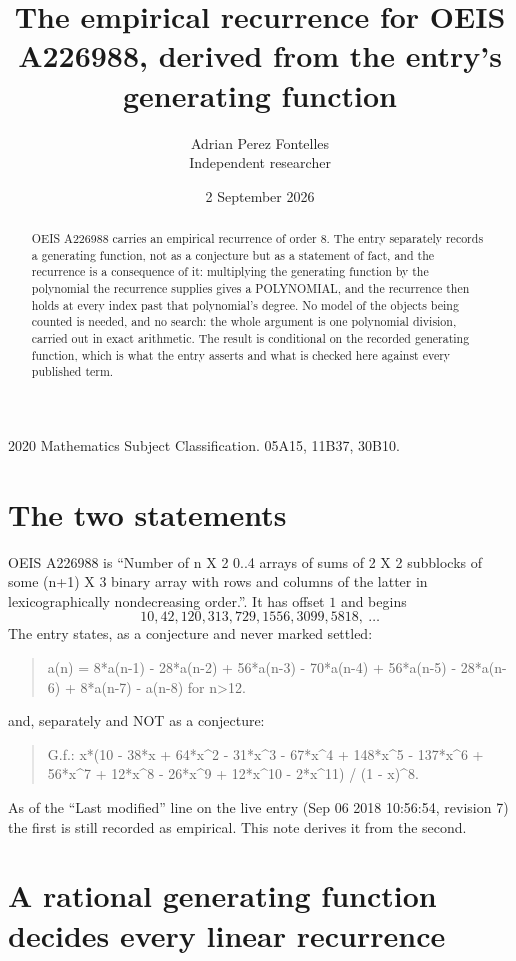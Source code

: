 \documentclass[11pt,a4paper]{article}
\title{The empirical recurrence for OEIS A226988, derived from the entry's generating function}
\author{Adrian Perez Fontelles\\ \small Independent researcher}
\date{2 September 2026}
\theoremstyle{plain}
\theoremstyle{definition}
\begin{document}
\maketitle

\begin{abstract}
OEIS A226988 carries an empirical recurrence of order $8$. The entry separately records a
generating function, not as a conjecture but as a statement of fact, and the recurrence is a
consequence of it: multiplying the generating function by the polynomial the recurrence
supplies gives a POLYNOMIAL, and the recurrence then holds at every index past that
polynomial's degree. No model of the objects being counted is needed, and no search: the
whole argument is one polynomial division, carried out in exact arithmetic. The result is
conditional on the recorded generating function, which is what the entry asserts and what is
checked here against every published term.
\end{abstract}

\noindent\small 2020 Mathematics Subject Classification. 05A15, 11B37, 30B10.\normalsize

\section{The two statements}

OEIS A226988 is ``Number of n X 2 0..4 arrays of sums of 2 X 2 subblocks of some (n+1) X 3 binary array with rows and columns of the latter in lexicographically nondecreasing order.''. It has offset $1$ and begins
\[
10, 42, 120, 313, 729, 1556, 3099, 5818,\ \dots
\]
The entry states, as a conjecture and never marked settled:
\begin{quote}
a(n) = 8*a(n-1) - 28*a(n-2) + 56*a(n-3) - 70*a(n-4) + 56*a(n-5) - 28*a(n-6) + 8*a(n-7) - a(n-8) for n>12.
\end{quote}
and, separately and NOT as a conjecture:
\begin{quote}
G.f.: x*(10 - 38*x + 64*x\^{}2 - 31*x\^{}3 - 67*x\^{}4 + 148*x\^{}5 - 137*x\^{}6 + 56*x\^{}7 + 12*x\^{}8 - 26*x\^{}9 + 12*x\^{}10 - 2*x\^{}11) / (1 - x)\^{}8.
\end{quote}
As of the ``Last modified'' line on the live entry (Sep 06 2018 10:56:54, revision 7) the first is still
recorded as empirical. This note derives it from the second.

\section{A rational generating function decides every linear recurrence}
\end{document}
